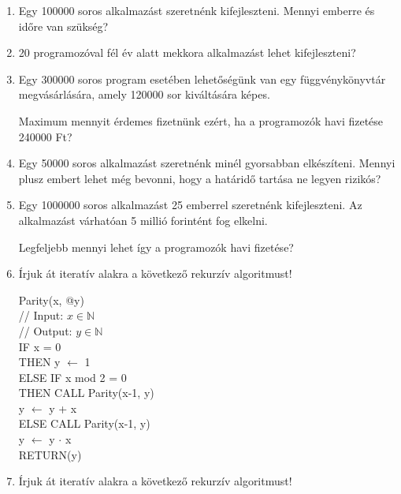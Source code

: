 \documentclass[a4paper]{article}
\begin{document}
\begin{enumerate}

\item Egy 100000 soros alkalmazást szeretnénk kifejleszteni. Mennyi emberre és időre van szükség?

\item 20 programozóval fél év alatt mekkora alkalmazást lehet kifejleszteni?

\item Egy 300000 soros program esetében lehetőségünk van egy függvénykönyvtár megvásárlására, amely 120000 sor kiváltására képes.

\medskip

Maximum mennyit érdemes fizetnünk ezért, ha a programozók havi fizetése 240000 Ft?

\item Egy 50000 soros alkalmazást szeretnénk minél gyorsabban elkészíteni. Mennyi plusz embert lehet még bevonni, hogy a határidő tartása ne legyen rizikós?

\item Egy 1000000 soros alkalmazást 25 emberrel szeretnénk kifejleszteni. Az alkalmazást várhatóan 5 millió forintént fog elkelni.

\medskip

Legfeljebb mennyi lehet így a programozók havi fizetése?

\item

Írjuk át iteratív alakra a következő rekurzív algoritmust!

Parity(x, @y) \\
// Input: $x \in \mathbb{N}$ \\
// Output: $y \in \mathbb{N}$ \\
IF x = 0 \\
\indent \quad THEN y $\leftarrow$ 1 \\
\indent \quad ELSE IF x mod 2 = 0 \\
\indent \quad \quad THEN CALL Parity(x-1, y) \\
\indent \quad \quad \quad \quad \quad y $\leftarrow$ y + x \\
\indent \quad \quad ELSE CALL Parity(x-1, y) \\
\indent \quad \quad \quad \quad \quad y $\leftarrow$ y $\cdot$ x \\
RETURN(y)

\item

Írjuk át iteratív alakra a következő rekurzív algoritmust!


\end{enumerate}
\end{document}
